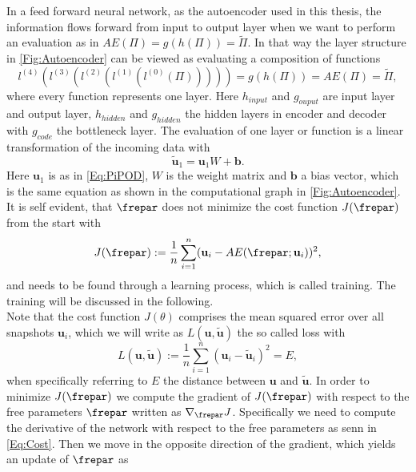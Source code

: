 In a feed forward neural network, as the autoencoder used in this thesis, the information flows forward from input to output layer when we want to perform an evaluation as in \(AE(\Pi) = g(h(\Pi)) =\tilde{\Pi}\). In that way the layer structure in \cref{Fig:Autoencoder} can be viewed as evaluating a composition of functions
\begin{equation}
	l^{(4)}(l^{(3)}(l^{(2)}(l^{(1)}(l^{(0)}(\Pi))))) = g(h(\Pi)) = AE(\Pi) = \tilde{\Pi}\mathrm{,}
	\label{Eq:Composition}
\end{equation}
where every function represents one layer. Here \(h_{input}\) and \(g_{ouput}\) are input layer and output layer, \(h_{hidden}\) and \(g_{hidden}\) the hidden layers in encoder and decoder with \(g_{code}\) the bottleneck layer. The evaluation of one layer or function is a linear transformation of the incoming data with
\begin{equation}
\tilde{\mathbf{u}}_1 = \mathbf{u}_1W + \mathbf{b}\mathrm{.} \label{Eq. Linear Transformation}
\end{equation}
Here \(\mathbf{u}_1\) is as in \cref{Eq:PiPOD}, \(W\) is the weight matrix and \(\mathbf{b}\) a bias vector, which is the same equation as shown in the computational graph in \cref{Fig:Autoencoder}. It is self evident, that \(\frepar\) does not minimize the cost function \(J(\frepar)\) from the start with
\begin{equation}
	J(\frepar) := \frac{1}{n}\sum_{i=1}^n (\mathbf{u}_i - AE(\frepar;\mathbf{u}_i))^2\mathrm{,}
	\label{Eq:Cost}
\end{equation}
and needs to be found through a learning process, which is called training. The training will be discussed in the following.\\
Note that the cost function \(J(\theta)\) comprises the mean squared error over all snapshots \(\mathbf{u}_i\), which we will write as \(L(\mathbf{u},\tilde{\mathbf{u}})\) the so called loss with
\begin{equation}
	L(\mathbf{u},\tilde{\mathbf{u}}) := \frac{1}{n}\sum_{i=1}^n(\mathbf{u}_i - \tilde{\mathbf{u}}_i)^2 = E \mathrm{,}
\end{equation}
when specifically referring to \(E\) the distance between \(\mathbf{u}\) and $\tilde{\mathbf{u}}$. In order to minimize \(J(\frepar)\) we compute the gradient of \(J(\frepar)\) with respect to the free parameters \(\frepar\) written as \(\nabla_{\frepar}J\). Specifically we need to compute the derivative of the network with respect to the free parameters as senn in \cref{Eq:Cost}. Then we move in the opposite direction of the gradient, which yields an update of \(\frepar\) as
